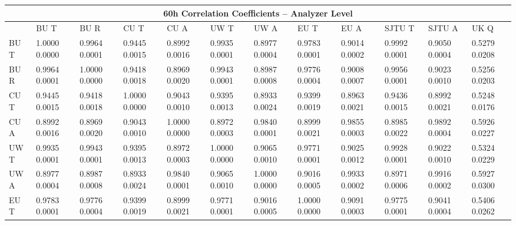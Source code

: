 \begin{landscape}
\begin{table}
\small
\centering
\renewcommand{\arraystretch}{1.5}
\begin{tabularx}{1\linewidth}{@{\extracolsep{\fill}}lXXXXXXXXXXX}
  \toprule
  	\multicolumn{12}{c}{{\normalsize 60h Correlation Coefficients -- Analyzer Level}} \\
  \midrule
  	       & BU T & BU R & CU T & CU A & UW T & UW A & EU T & EU A & SJTU T & SJTU A & UK Q \\
  \midrule
	BU T   & 1.0000 0.0000 & 0.9964 0.0001 & 0.9445 0.0015 & 0.8992 0.0016 & 0.9935 0.0001 & 0.8977 0.0004 & 0.9783 0.0001 & 0.9014 0.0002 & 0.9992 0.0001 & 0.9050 0.0004 & 0.5279 0.0208  \\
	BU R   & 0.9964 0.0001 & 1.0000 0.0000 & 0.9418 0.0018 & 0.8969 0.0020 & 0.9943 0.0001 & 0.8987 0.0008 & 0.9776 0.0004 & 0.9008 0.0007 & 0.9956 0.0001 & 0.9023 0.0010 & 0.5256 0.0203  \\
	CU T   & 0.9445 0.0015 & 0.9418 0.0018 & 1.0000 0.0000 & 0.9043 0.0010 & 0.9395 0.0013 & 0.8933 0.0024 & 0.9399 0.0019 & 0.8963 0.0021 & 0.9436 0.0015 & 0.8992 0.0021 & 0.5248 0.0176  \\
	CU A   & 0.8992 0.0016 & 0.8969 0.0020 & 0.9043 0.0010 & 1.0000 0.0000 & 0.8972 0.0003 & 0.9840 0.0001 & 0.8999 0.0021 & 0.9855 0.0003 & 0.8985 0.0022 & 0.9892 0.0004 & 0.5926 0.0227  \\
	UW T   & 0.9935 0.0001 & 0.9943 0.0001 & 0.9395 0.0013 & 0.8972 0.0003 & 1.0000 0.0000 & 0.9065 0.0010 & 0.9771 0.0001 & 0.9025 0.0012 & 0.9928 0.0001 & 0.9022 0.0010 & 0.5324 0.0229  \\
	UW A   & 0.8977 0.0004 & 0.8987 0.0008 & 0.8933 0.0024 & 0.9840 0.0001 & 0.9065 0.0010 & 1.0000 0.0000 & 0.9016 0.0005 & 0.9933 0.0002 & 0.8971 0.0006 & 0.9916 0.0002 & 0.5927 0.0300  \\
	EU T   & 0.9783 0.0001 & 0.9776 0.0004 & 0.9399 0.0019 & 0.8999 0.0021 & 0.9771 0.0001 & 0.9016 0.0005 & 1.0000 0.0000 & 0.9091 0.0003 & 0.9775 0.0001 & 0.9041 0.0004 & 0.5406 0.0262  \\

\end{tabularx}
\end{table}
\end{landscape}
